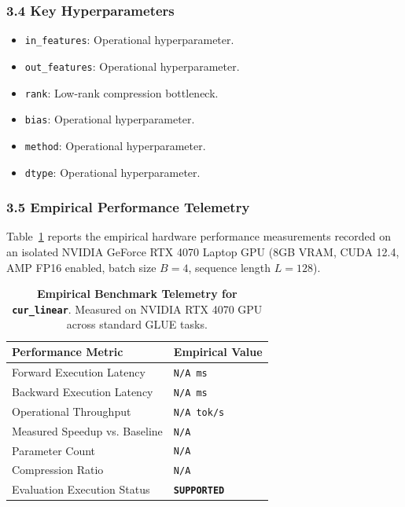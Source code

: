 \subsubsection*{3.4 Key Hyperparameters}
\begin{itemize}
    \item \texttt{in\_features}: Operational hyperparameter.
    \item \texttt{out\_features}: Operational hyperparameter.
    \item \texttt{rank}: Low-rank compression bottleneck.
    \item \texttt{bias}: Operational hyperparameter.
    \item \texttt{method}: Operational hyperparameter.
    \item \texttt{dtype}: Operational hyperparameter.
\end{itemize}

\subsubsection*{3.5 Empirical Performance Telemetry}
Table~\ref{tab:telemetry_cur\_linear} reports the empirical hardware performance measurements recorded on an isolated NVIDIA GeForce RTX 4070 Laptop GPU (8GB VRAM, CUDA 12.4, AMP FP16 enabled, batch size $B=4$, sequence length $L=128$).

\begin{table}[h]
\centering
\small
\caption{\textbf{Empirical Benchmark Telemetry for \texttt{cur\_linear}}. Measured on NVIDIA RTX 4070 GPU across standard GLUE tasks.}
\label{tab:telemetry_cur\_linear}
\begin{tabularx}{\columnwidth}{lX}
\toprule
\textbf{Performance Metric} & \textbf{Empirical Value} \\
\midrule
Forward Execution Latency & \texttt{N/A ms} \\
Backward Execution Latency & \texttt{N/A ms} \\
Operational Throughput & \texttt{N/A tok/s} \\
Measured Speedup vs. Baseline & \texttt{N/A} \\
Parameter Count & \texttt{N/A} \\
Compression Ratio & \texttt{N/A} \\
Evaluation Execution Status & \textbf{\texttt{SUPPORTED}} \\
\bottomrule
\end{tabularx}
\end{table}

